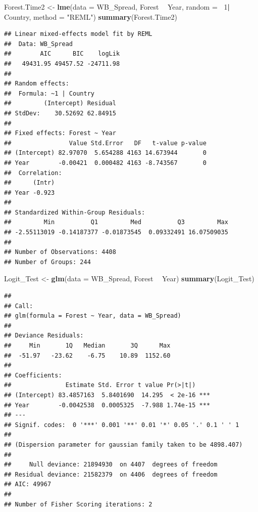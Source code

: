 \documentclass[12pt,]{article}
\newenvironment{Shaded}{\begin{snugshade}}{\end{snugshade}}
\newcommand{\KeywordTok}[1]{\textcolor[rgb]{0.13,0.29,0.53}{\textbf{#1}}}
\newcommand{\DataTypeTok}[1]{\textcolor[rgb]{0.13,0.29,0.53}{#1}}
\newcommand{\DecValTok}[1]{\textcolor[rgb]{0.00,0.00,0.81}{#1}}
\newcommand{\StringTok}[1]{\textcolor[rgb]{0.31,0.60,0.02}{#1}}
\newcommand{\OperatorTok}[1]{\textcolor[rgb]{0.81,0.36,0.00}{\textbf{#1}}}
\newcommand{\NormalTok}[1]{#1}
\begin{document}
\begin{Shaded}
\begin{Highlighting}[]
\NormalTok{Forest.Time2 <-}\StringTok{ }\KeywordTok{lme}\NormalTok{(}\DataTypeTok{data =}\NormalTok{ WB_Spread,}
\NormalTok{                Forest }\OperatorTok{~}\StringTok{ }\NormalTok{Year,}
                \DataTypeTok{random =} \OperatorTok{~}\DecValTok{1}\OperatorTok{|}\StringTok{ }\NormalTok{Country,}
                \DataTypeTok{method =} \StringTok{"REML"}\NormalTok{)}
\KeywordTok{summary}\NormalTok{(Forest.Time2)}
\end{Highlighting}
\end{Shaded}

\begin{verbatim}
## Linear mixed-effects model fit by REML
##  Data: WB_Spread 
##        AIC      BIC    logLik
##   49431.95 49457.52 -24711.98
## 
## Random effects:
##  Formula: ~1 | Country
##         (Intercept) Residual
## StdDev:    30.52692 62.84915
## 
## Fixed effects: Forest ~ Year 
##                Value Std.Error   DF   t-value p-value
## (Intercept) 82.97070  5.654288 4163 14.673944       0
## Year        -0.00421  0.000482 4163 -8.743567       0
##  Correlation: 
##      (Intr)
## Year -0.923
## 
## Standardized Within-Group Residuals:
##         Min          Q1         Med          Q3         Max 
## -2.55113019 -0.14187377 -0.01873545  0.09332491 16.07509035 
## 
## Number of Observations: 4408
## Number of Groups: 244
\end{verbatim}

\begin{Shaded}
\begin{Highlighting}[]
\NormalTok{Logit_Test <-}\StringTok{ }\KeywordTok{glm}\NormalTok{(}\DataTypeTok{data =}\NormalTok{ WB_Spread,}
\NormalTok{             Forest }\OperatorTok{~}\StringTok{ }\NormalTok{Year)}
\KeywordTok{summary}\NormalTok{(Logit_Test)}
\end{Highlighting}
\end{Shaded}

\begin{verbatim}
## 
## Call:
## glm(formula = Forest ~ Year, data = WB_Spread)
## 
## Deviance Residuals: 
##     Min       1Q   Median       3Q      Max  
##  -51.97   -23.62    -6.75    10.89  1152.60  
## 
## Coefficients:
##               Estimate Std. Error t value Pr(>|t|)    
## (Intercept) 83.4857163  5.8401690  14.295  < 2e-16 ***
## Year        -0.0042538  0.0005325  -7.988 1.74e-15 ***
## ---
## Signif. codes:  0 '***' 0.001 '**' 0.01 '*' 0.05 '.' 0.1 ' ' 1
## 
## (Dispersion parameter for gaussian family taken to be 4898.407)
## 
##     Null deviance: 21894930  on 4407  degrees of freedom
## Residual deviance: 21582379  on 4406  degrees of freedom
## AIC: 49967
## 
## Number of Fisher Scoring iterations: 2
\end{verbatim}
\end{document}
